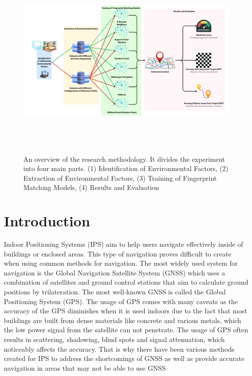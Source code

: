 \documentclass[conference]{IEEEtran}
\begin{document}
	\begin{figure}
		\includegraphics[width=\textwidth,height=10cm]{meth1.png}
		\caption{An overview of the research methodology. It divides the experiment into four main parts. (1) Identification of Environmental Factors, (2) Extraction of Environmental Factors, (3) Training of Fingerprint Matching Models, (4) Results and Evaluation}
		\label{fig:graph_step}
	\end{figure}
	
	\section{Introduction}
	Indoor Positioning Systems (IPS) aim to help users navigate effectively inside of buildings or enclosed areas. This type of navigation proves difficult to create when using common methods for navigation. The most widely used system for navigation is the Global Navigation Satellite System (GNSS) which uses a combination of satellites and ground control stations that aim to calculate ground positions by trilateration. The most well-known GNSS is called the Global Positioning System (GPS). The usage of GPS comes with many caveats as the accuracy of the GPS diminishes when it is used indoors due to the fact that most buildings are built from dense materials like concrete and various metals, which the low power signal from the satellite can not penetrate. The usage of GPS often results in scattering, shadowing, blind spots and signal attenuation, which noticeably affects the accuracy\cite{bgp1}. That is why there have been various methods created for IPS to address the shortcomings of GNSS as well as provide accurate navigation in areas that may not be able to use GNSS
	
\end{document}
